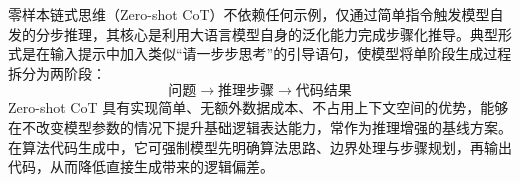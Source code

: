 
零样本链式思维（Zero-shot CoT）不依赖任何示例，仅通过简单指令触发模型自发的分步推理，其核心是利用大语言模型自身的泛化能力完成步骤化推导\cite{kojima2022large,wei2022chain,li2024cotkd}。典型形式是在输入提示中加入类似“请一步步思考”的引导语句，使模型将单阶段生成过程拆分为两阶段：
\[
\text{问题} \rightarrow \text{推理步骤} \rightarrow \text{代码结果}
\]
Zero-shot CoT 具有实现简单、无额外数据成本、不占用上下文空间的优势，能够在不改变模型参数的情况下提升基础逻辑表达能力，常作为推理增强的基线方案。在算法代码生成中，它可强制模型先明确算法思路、边界处理与步骤规划，再输出代码，从而降低直接生成带来的逻辑偏差。